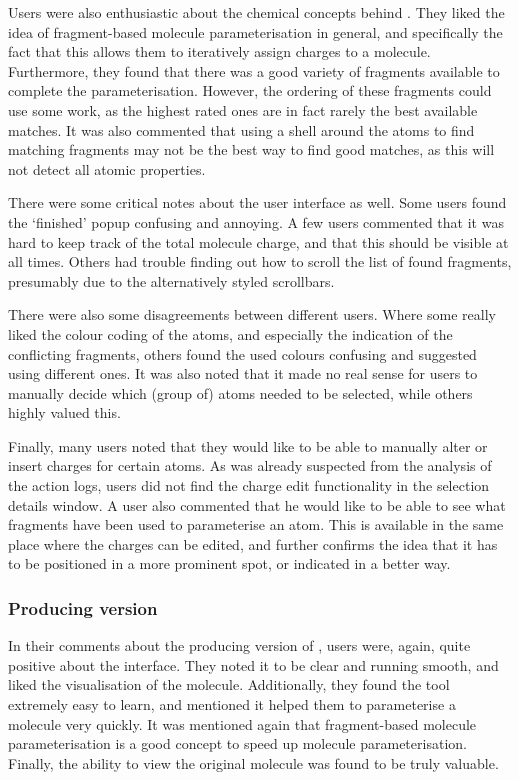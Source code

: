 Users were also enthusiastic about the chemical concepts behind \oframp. They liked the idea of fragment-based molecule parameterisation in general, and specifically the fact that this allows them to iteratively assign charges to a molecule. Furthermore, they found that there was a good variety of fragments available to complete the parameterisation. However, the ordering of these fragments could use some work, as the highest rated ones are in fact rarely the best available matches. It was also commented that using a shell around the atoms to find matching fragments may not be the best way to find good matches, as this will not detect all atomic properties.

There were some critical notes about the user interface as well. Some users found the `finished' popup confusing and annoying. A few users commented that it was hard to keep track of the total molecule charge, and that this should be visible at all times. Others had trouble finding out how to scroll the list of found fragments, presumably due to the alternatively styled scrollbars.

There were also some disagreements between different users. Where some really liked the colour coding of the atoms, and especially the indication of the conflicting fragments, others found the used colours confusing and suggested using different ones. It was also noted that it made no real sense for users to manually decide which (group of) atoms needed to be selected, while others highly valued this.

Finally, many users noted that they would like to be able to manually alter or insert charges for certain atoms. As was already suspected from the analysis of the action logs, users did not find the charge edit functionality in the selection details window. A user also commented that he would like to be able to see what fragments have been  used to parameterise an atom. This is available in the same place where the charges can be edited, and further confirms the idea that it has to be positioned in a more prominent spot, or indicated in a better way.


\subsubsection{Producing version}
In their comments about the producing version of \oframp, users were, again, quite positive about the interface. They noted it to be clear and running smooth, and liked the visualisation of the molecule. Additionally, they found the tool extremely easy to learn, and mentioned it helped them to parameterise a molecule very quickly. It was mentioned again that fragment-based molecule parameterisation is a good concept to speed up molecule parameterisation. Finally, the ability to view the original molecule was found to be truly valuable.

